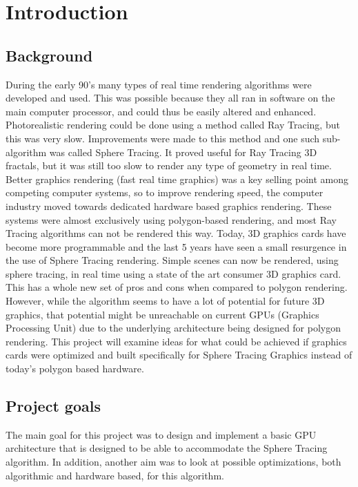\chapter{Introduction} 
	
	\section{Background}
		During the early 90’s many types of real time rendering algorithms were 
		developed and used. This was possible because they all ran in software 
		on the main computer processor, and could thus be easily altered and 
		enhanced. Photorealistic rendering could be done using a method called 
		Ray Tracing, but this was very slow. Improvements were made to this 
		method and one such sub-algorithm was called Sphere Tracing. It proved
		useful for Ray Tracing 3D fractals, but it was still too slow to render
		any type of geometry in real time. Better graphics rendering (fast 
		real time graphics) was a key selling point among competing computer 
		systems, so to improve rendering speed, the computer industry moved 
		towards dedicated hardware based graphics rendering. These systems were
		almost exclusively using polygon-based rendering, and most Ray Tracing 
		algorithms can not be rendered this way. Today, 3D graphics cards have 
		become more programmable and the last 5 years have seen a small 
		resurgence in the use of Sphere Tracing	rendering. Simple scenes can 
		now be rendered, using sphere tracing, in real time using a state of 
		the art consumer 3D graphics card. This has a whole new set of pros 
		and cons when compared to polygon rendering. However, while 
		the algorithm seems to have a lot of potential for future 3D graphics, 
		that potential might be unreachable on current GPUs (Graphics 
		Processing Unit) due to the underlying architecture being designed for 
		polygon rendering. This project will examine ideas for what could be 
		achieved if graphics cards were optimized and built specifically for 
		Sphere Tracing Graphics	instead of today’s polygon based hardware.		 
	
	\section{Project goals}

		The main goal for this project was to design and implement a basic GPU 
		architecture that is designed to be able to accommodate the Sphere 
		Tracing algorithm. In addition, another aim was to look at possible 
		optimizations, both algorithmic	and hardware based, for this algorithm.
		
